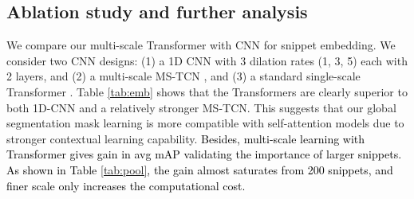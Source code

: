 \documentclass[runningheads]{llncs}
\begin{document}
\subsection{Ablation study and further analysis}
\label{sec:ablation}
We compare our multi-scale Transformer with CNN for snippet embedding.
We consider two CNN designs:
(1) a 1D CNN
with 3 dilation rates 
(1, 3, 5) each with 2 layers,
 and 
(2) a multi-scale MS-TCN \cite{farha2019ms}, 
and (3) a standard single-scale Transformer \cite{vaswani2017attention}.
Table \ref{tab:emb} shows that 
the Transformers are clearly superior to both 1D-CNN and a relatively stronger MS-TCN. This suggests that our global segmentation mask learning is more compatible with self-attention models due to stronger contextual learning capability.
\noindent \textcolor{black}{Besides, multi-scale learning with Transformer gives  gain in avg mAP validating the importance of larger snippets. As shown in Table \ref{tab:pool}, the gain almost saturates from 200 snippets,
and finer scale only increases the computational cost.}
\end{document}
